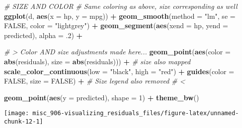\documentclass[]{book}
\newenvironment{Shaded}{\begin{snugshade}}{\end{snugshade}}
\newcommand{\CommentTok}[1]{\textcolor[rgb]{0.56,0.35,0.01}{\textit{#1}}}
\newcommand{\DataTypeTok}[1]{\textcolor[rgb]{0.13,0.29,0.53}{#1}}
\newcommand{\DecValTok}[1]{\textcolor[rgb]{0.00,0.00,0.81}{#1}}
\newcommand{\FloatTok}[1]{\textcolor[rgb]{0.00,0.00,0.81}{#1}}
\newcommand{\KeywordTok}[1]{\textcolor[rgb]{0.13,0.29,0.53}{\textbf{#1}}}
\newcommand{\NormalTok}[1]{#1}
\newcommand{\OperatorTok}[1]{\textcolor[rgb]{0.81,0.36,0.00}{\textbf{#1}}}
\newcommand{\OtherTok}[1]{\textcolor[rgb]{0.56,0.35,0.01}{#1}}
\newcommand{\StringTok}[1]{\textcolor[rgb]{0.31,0.60,0.02}{#1}}
\begin{document}
\begin{Shaded}
\begin{Highlighting}[]
\CommentTok{# SIZE AND COLOR}
\CommentTok{# Same coloring as above, size corresponding as well}
\KeywordTok{ggplot}\NormalTok{(d, }\KeywordTok{aes}\NormalTok{(}\DataTypeTok{x =}\NormalTok{ hp, }\DataTypeTok{y =}\NormalTok{ mpg)) }\OperatorTok{+}
\StringTok{  }\KeywordTok{geom_smooth}\NormalTok{(}\DataTypeTok{method =} \StringTok{"lm"}\NormalTok{, }\DataTypeTok{se =} \OtherTok{FALSE}\NormalTok{, }\DataTypeTok{color =} \StringTok{"lightgrey"}\NormalTok{) }\OperatorTok{+}
\StringTok{  }\KeywordTok{geom_segment}\NormalTok{(}\KeywordTok{aes}\NormalTok{(}\DataTypeTok{xend =}\NormalTok{ hp, }\DataTypeTok{yend =}\NormalTok{ predicted), }\DataTypeTok{alpha =} \FloatTok{.2}\NormalTok{) }\OperatorTok{+}

\StringTok{  }\CommentTok{# > Color AND size adjustments made here...}
\StringTok{  }\KeywordTok{geom_point}\NormalTok{(}\KeywordTok{aes}\NormalTok{(}\DataTypeTok{color =} \KeywordTok{abs}\NormalTok{(residuals), }\DataTypeTok{size =} \KeywordTok{abs}\NormalTok{(residuals))) }\OperatorTok{+}\StringTok{ }\CommentTok{# size also mapped}
\StringTok{  }\KeywordTok{scale_color_continuous}\NormalTok{(}\DataTypeTok{low =} \StringTok{"black"}\NormalTok{, }\DataTypeTok{high =} \StringTok{"red"}\NormalTok{) }\OperatorTok{+}
\StringTok{  }\KeywordTok{guides}\NormalTok{(}\DataTypeTok{color =} \OtherTok{FALSE}\NormalTok{, }\DataTypeTok{size =} \OtherTok{FALSE}\NormalTok{) }\OperatorTok{+}\StringTok{  }\CommentTok{# Size legend also removed}
\StringTok{  }\CommentTok{# <}

\StringTok{  }\KeywordTok{geom_point}\NormalTok{(}\KeywordTok{aes}\NormalTok{(}\DataTypeTok{y =}\NormalTok{ predicted), }\DataTypeTok{shape =} \DecValTok{1}\NormalTok{) }\OperatorTok{+}
\StringTok{  }\KeywordTok{theme_bw}\NormalTok{()}
\end{Highlighting}
\end{Shaded}

\begin{center}\texttt{[image: misc\_906-visualizing\_residuals\_files/figure-latex/unnamed-chunk-12-1]} \end{center}
\end{document}
